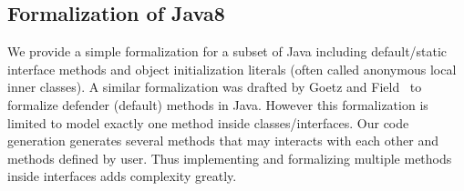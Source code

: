 \subsection{Formalization of Java8}
We provide a simple formalization for a subset of Java including default/static
interface methods and object initialization literals (often called anonymous
local inner classes).  A similar formalization was drafted by Goetz and
Field~\cite{goetz12fdefenders} to formalize defender (default) methods in
Java. However this formalization is limited to model exactly one method inside
classes/interfaces. Our code generation generates several methods that may
interacts with each other and methods defined by user. Thus implementing and
formalizing multiple methods inside interfaces adds complexity greatly.
